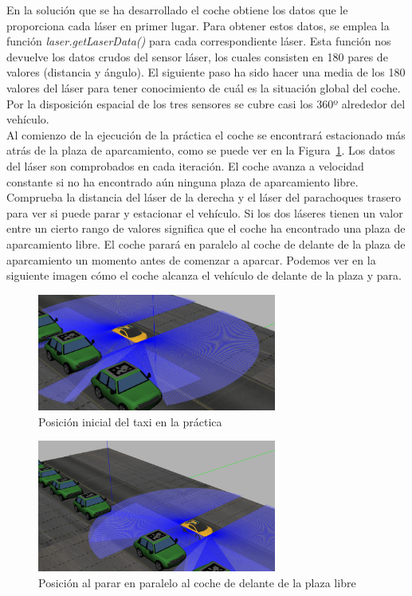 En la solución que se ha desarrollado el coche obtiene los datos que le proporciona cada láser en primer lugar. Para obtener estos datos, se emplea la función \textit{laser.getLaserData()} para cada correspondiente láser. Esta función nos devuelve los datos crudos del sensor láser, los cuales consisten en 180 pares de valores (distancia y ángulo). El siguiente paso ha sido hacer una media de los 180 valores del láser para tener conocimiento de cuál es la situación global del coche. Por la disposición espacial de los tres sensores se cubre casi los 360º alrededor del vehículo.\\

Al comienzo de la ejecución de la práctica el coche se encontrará estacionado más atrás de la plaza de aparcamiento, como se puede ver en la Figura~\ref{fig.Posicion1}. Los datos del láser son comprobados en cada iteración. El coche avanza a velocidad constante si no ha encontrado aún ninguna plaza de aparcamiento libre. Comprueba la distancia del láser de la derecha y el láser del parachoques trasero para ver si puede parar y estacionar el vehículo. Si los dos láseres tienen un valor entre un cierto rango de valores significa que el coche ha encontrado una plaza de aparcamiento libre. El coche parará en paralelo al coche de delante de la plaza de aparcamiento un momento antes de comenzar a aparcar. Podemos ver en la siguiente imagen cómo el coche alcanza el vehículo de delante de la plaza y para.


\begin{figure}[H]
  \begin{center}
    \includegraphics[width=0.7\textwidth]{figures/Autopark/Posicion1.png}
		\caption{Posición inicial del taxi en la práctica}
		\label{fig.Posicion1}
		\end{center}
\end{figure}


\begin{figure}[H]
  \begin{center}
    \includegraphics[width=0.7\textwidth]{figures/Autopark/Posicion2.png}
		\caption{Posición al parar en paralelo al coche de delante de la plaza libre}
		\label{fig.Posicion2}
		\end{center}
\end{figure}

